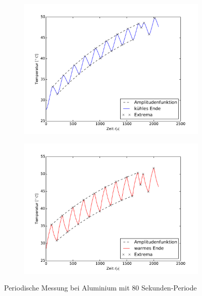 \begin{figure}[htp]
	\label{fig:M2Alu}
	\centering
	\begin{subfigure}{0.9\textwidth}
	\centering
	\includegraphics[width=\textwidth]{Bilder/M2_Alu_kuehl.pdf}
	\end{subfigure}
	\begin{subfigure}{0.9\textwidth}
	\centering
	\includegraphics[width=\textwidth]{Bilder/M2_Alu_warm.pdf}
	\end{subfigure}
	\caption{Periodische Messung bei Aluminium mit 80 Sekunden-Periode}
\end{figure}
